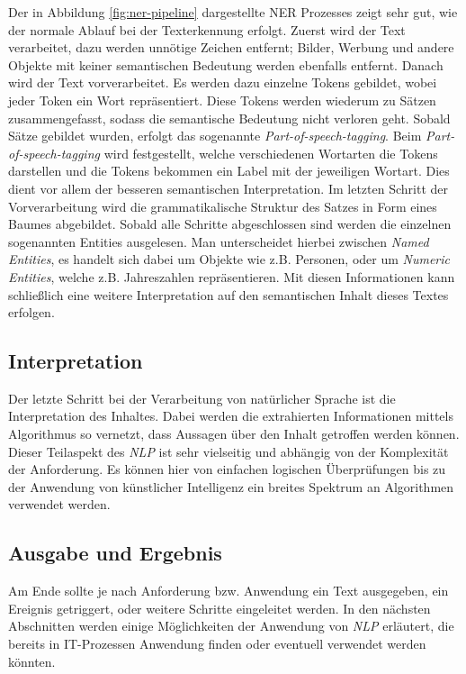 Der in Abbildung \ref{fig:ner-pipeline} dargestellte NER Prozesses zeigt sehr gut, wie der normale Ablauf bei der Texterkennung erfolgt. Zuerst wird der Text verarbeitet, dazu werden unnötige Zeichen entfernt; Bilder, Werbung und andere Objekte mit keiner semantischen Bedeutung werden ebenfalls entfernt. Danach wird der Text vorverarbeitet. Es werden dazu einzelne Tokens gebildet, wobei jeder Token ein Wort repräsentiert. Diese Tokens werden wiederum zu Sätzen zusammengefasst, sodass die semantische Bedeutung nicht verloren geht. Sobald Sätze gebildet wurden, erfolgt das sogenannte \textit{Part-of-speech-tagging}. Beim \textit{Part-of-speech-tagging} wird festgestellt, welche verschiedenen Wortarten die Tokens darstellen und die Tokens bekommen ein Label mit der jeweiligen Wortart. Dies dient vor allem der besseren semantischen Interpretation. Im letzten Schritt der Vorverarbeitung wird die grammatikalische Struktur des Satzes in Form eines Baumes abgebildet. Sobald alle Schritte abgeschlossen sind werden die einzelnen sogenannten Entities ausgelesen. Man unterscheidet hierbei zwischen \textit{Named Entities}, es handelt sich dabei um Objekte wie z.B. Personen, oder um \textit{Numeric Entities}, welche z.B. Jahreszahlen repräsentieren. Mit diesen Informationen kann schließlich eine weitere Interpretation auf den semantischen Inhalt dieses Textes erfolgen.

\subsection{Interpretation}
Der letzte Schritt bei der Verarbeitung von natürlicher Sprache ist die Interpretation des Inhaltes. Dabei werden die extrahierten Informationen mittels Algorithmus so vernetzt, dass Aussagen über den Inhalt getroffen werden können. Dieser Teil\-aspekt des \textit{NLP} ist sehr vielseitig und abhängig von der Komplexität der Anforderung. Es können hier von einfachen logischen Überprüfungen bis zu der Anwendung von künstlicher Intelligenz ein breites Spektrum an Algorithmen verwendet werden. 

\subsection{Ausgabe und Ergebnis}
Am Ende sollte je nach Anforderung bzw. Anwendung ein Text ausgegeben, ein Ereignis getriggert, oder weitere Schritte eingeleitet werden. In den nächsten Abschnitten werden einige Möglichkeiten der Anwendung von \textit{NLP} erläutert, die bereits in IT-Prozessen Anwendung finden oder eventuell verwendet werden könnten. 

